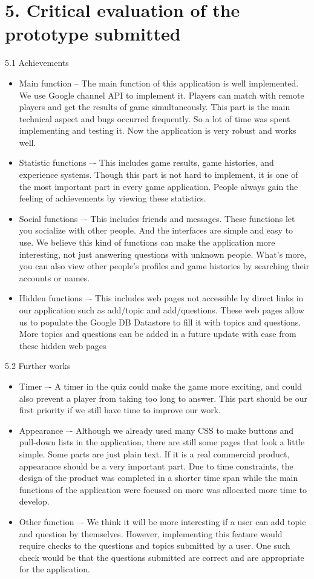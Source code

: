 \documentclass{article}
\begin{document}
\section{5. Critical evaluation of the prototype submitted}

5.1 Achievements
\begin{itemize}
\item Main function -- The main function of this application is well implemented. We use Google channel API to implement it. Players can match with remote players and get the results of game simultaneously. This part is the main technical aspect and bugs occurred frequently. So a lot of time was spent implementing and testing it. Now the application is very robust and works well.
\item Statistic functions –- This includes game results, game histories, and experience systems. Though this part is not hard to implement, it is one of the most important part in every game application. People always gain the feeling of achievements by viewing these statistics.
\item Social functions –- This includes friends and messages. These functions let you socialize with other people. And the interfaces are simple and easy to use. We believe this kind of functions can make the application more interesting, not just answering questions with unknown people. What’s more, you can also view other people’s profiles and game histories by searching their accounts or names.
\item Hidden functions –- This includes web pages not accessible by direct links in our application such as add/topic and add/questions. These web pages allow us to populate the Google DB Datastore to fill it with topics and questions. More topics and questions can be added in a future update with ease from these hidden web pages
\end{itemize}

5.2 Further works
\begin{itemize}
\item Timer –- A timer in the quiz could make the game more exciting, and could also prevent a player from taking too long to answer. This part should be our first priority if we still have time to improve our work.
\item Appearance –- Although we already used many CSS to make buttons and pull-down lists in the application, there are still some pages that look a little simple. Some parts are just plain text. If it is a real commercial product, appearance should be a very important part. Due to time constraints, the design of the product was completed in a shorter time span while the main functions of the application were focused on more was allocated more time to develop. 
\item Other function –- We think it will be more interesting if a user can add topic and question by themselves. However, implementing this feature would require checks to the questions and topics submitted by a user. One such check would be that the questions submitted are correct and are appropriate for the application.
\end{itemize}
\end{document}
